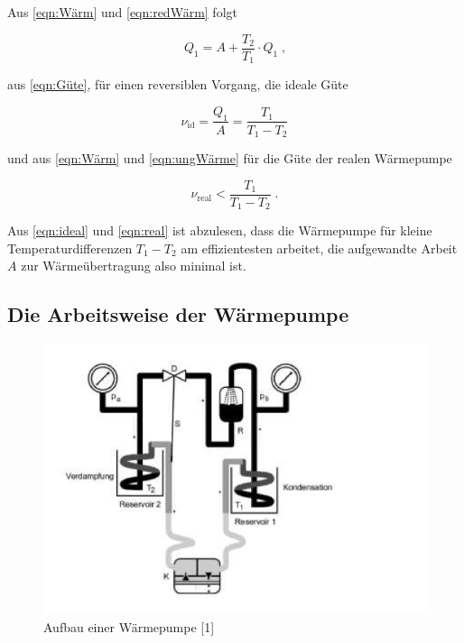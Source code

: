 Aus \ref{eqn:Wärm}  und \ref{eqn:redWärm} folgt

\begin{equation*}
    Q_1 = A + \frac{T_2}{T_1} \cdot Q_1 \; \text{,}
\end{equation*}

aus \ref{eqn:Güte}, für einen reversiblen Vorgang, die ideale Güte

\begin{equation}
    \nu_\text{id} = \frac{Q_1}{A} = \frac{T_1}{T_1 - T_2}
    \label{eqn:ideal}
\end{equation}

und aus \ref{eqn:Wärm} und \ref{eqn:ungWärme} für die Güte der realen Wärmepumpe

\begin{equation}
    \nu_\text{real} < \frac{T_1}{T_1 - T_2} \; \text{.}
    \label{eqn:real}
\end{equation}

Aus \ref{eqn:ideal} und \ref{eqn:real} ist abzulesen, dass die Wärmepumpe 
für kleine Temperaturdifferenzen $T_1 - T_2$ am effizientesten arbeitet, 
die aufgewandte Arbeit $A$ zur Wärmeübertragung also minimal ist.

\subsection{Die Arbeitsweise der Wärmepumpe}

\begin{figure}
      \centering
      \includegraphics[scale=0.4]{aufbau2.pdf}
      \caption{Aufbau einer Wärmepumpe [1]}
      \label{fig:aufbau2}
\end{figure}

